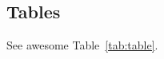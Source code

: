 \usepackage{}\documentclass{article}
\begin{document}
\subsection{Tables}
\lipsum[12]
See awesome Table~\ref{tab:table}.

\end{document}
